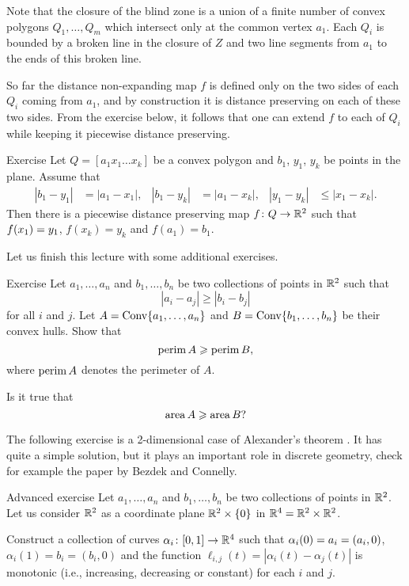 Note that the closure of the blind zone is a union of a finite number 
of convex polygons $Q_1,\dots, Q_m$ which intersect only at the common vertex $a_1$.
Each $Q_i$ is bounded by a broken line in the closure of $Z$ 
and two line segments from $a_1$ to the ends of this broken line. 

So far the distance non-expanding map $f$ 
is defined only on the two sides of each $Q_i$ coming from $a_1$, 
and by construction it is distance preserving on each of these two sides.
From the exercise below, it follows that
one can extend $f$ to each of $Q_i$ while keeping it piecewise distance preserving.
\qeds

\begin{thm}{Exercise}\label{ex:triangle-reflect}
Let $Q=[a_1x_1\dots x_k]$ be a convex polygon and $b_1$, $y_1$, $y_k$ be points in the plane.
Assume that 
\begin{align*}
|b_1-y_1|&=|a_1-x_1|,&
|b_1-y_k|&=|a_1-x_k|,&
|y_1-y_k|&\le|x_1-x_k|.
\end{align*}
Then there is a piecewise distance preserving map 
$f\colon Q\to \mathbb{R}^2$ such that $f(x_1)\z=y_1$, $f(x_k)= y_k$ and $f(a_1)= b_1$.
\end{thm}

Let us finish this lecture with some additional exercises.

\begin{thm}{Exercise}\label{pr:perimeter}
Let $a_1,\dots,a_n$ and $b_1,\dots,b_n$ be two collections of points in $\mathbb{R}^2$ such that 
$$|a_i-a_j|\ge |b_i-b_j|$$
for all $i$ and $j$.
Let $A=\operatorname{Conv}\{a_1,\dots,a_n\}$ 
and $B=\Conv\{b_1,\z\dots,b_n\}$ be their convex hulls.
Show that 
$$\operatorname{perim} A\geqslant \operatorname{perim} B,$$
where $\operatorname{perim} A$ denotes the perimeter of $A$.

Is it true that
$$\operatorname{area} A\geqslant \operatorname{area} B?$$

\end{thm}

The following exercise is a 2-dimensional case of Alexander's theorem
\cite{alexander}.
It has quite a simple solution,
but it plays an important role in discrete geometry,
check for example the paper \cite{bezdek-connelly} by Bezdek and Connelly.

\begin{thm}{Advanced exercise}\label{pr:alexander}
Let $a_1,\dots,a_n$ and $b_1,\dots,b_n$ be two collections of points in $\mathbb{R}^2$.
Let us consider $\mathbb{R}^2$ as a coordinate plane $\mathbb{R}^2 \times \{0\}$
in $\mathbb{R}^4=\mathbb{R}^2 \times \mathbb{R}^2$.

Construct a collection of curves $\alpha_i\colon[0,1]\to \mathbb{R}^4$ 
such that
$\alpha_i(0)=a_i\z=(a_i,0)$, $\alpha_i(1)=b_i=(b_i,0)$ and 
the function $\ell_{i,j}(t)=|\alpha_i(t)-\alpha_j(t)|$ 
is monotonic (i.e., increasing, decreasing or constant) for each $i$ and $j$.
\end{thm}

